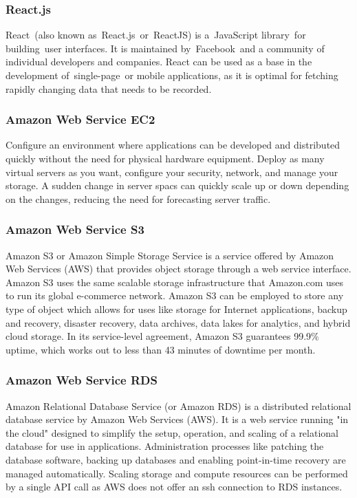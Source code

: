 \documentclass[conference,compsoc]{IEEEtran}
\begin{document}
\subsubsection{React.js}

React (also known as React.js or ReactJS) is a JavaScript library for building user interfaces. It is maintained by Facebook and a community of individual developers and companies. React can be used as a base in the development of single-page or mobile applications, as it is optimal for fetching rapidly changing data that needs to be recorded.

\subsubsection{Amazon Web Service EC2}

Configure an environment where applications can be developed and distributed quickly without the need for physical hardware equipment. Deploy as many virtual servers as you want, configure your security, network, and manage your storage. A sudden change in server spacs can quickly scale up or down depending on the changes, reducing the need for forecasting server traffic.

\subsubsection{Amazon Web Service S3}

Amazon S3 or Amazon Simple Storage Service is a service offered by Amazon Web Services (AWS) that provides object storage through a web service interface. Amazon S3 uses the same scalable storage infrastructure that Amazon.com uses to run its global e-commerce network. Amazon S3 can be employed to store any type of object which allows for uses like storage for Internet applications, backup and recovery, disaster recovery, data archives, data lakes for analytics, and hybrid cloud storage. In its service-level agreement, Amazon S3 guarantees 99.9\% uptime, which works out to less than 43 minutes of downtime per month.

\subsubsection{Amazon Web Service RDS}

Amazon Relational Database Service (or Amazon RDS) is a distributed relational database service by Amazon Web Services (AWS). It is a web service running "in the cloud" designed to simplify the setup, operation, and scaling of a relational database for use in applications. Administration processes like patching the database software, backing up databases and enabling point-in-time recovery are managed automatically. Scaling storage and compute resources can be performed by a single API call as AWS does not offer an ssh connection to RDS instances.
\end{document}
